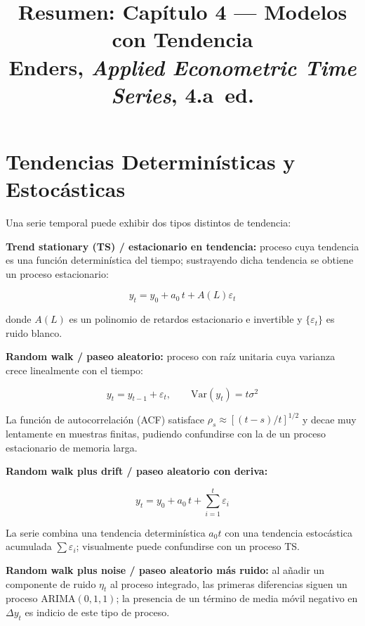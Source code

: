 \documentclass[12pt]{article}
\title{Resumen: Cap\'itulo 4 --- Modelos con Tendencia\\[4pt]
\large Enders, \textit{Applied Econometric Time Series}, 4.a~ed.}
\author{}
\date{}
\begin{document}
\maketitle
\tableofcontents
\newpage

\section{Tendencias Determin\'isticas y Estoc\'asticas}

Una serie temporal puede exhibir dos tipos distintos de tendencia:

\textbf{Trend stationary (TS) / estacionario en tendencia:} proceso cuya
tendencia es una funci\'on determin\'istica del tiempo; sustrayendo dicha
tendencia se obtiene un proceso estacionario:

\begin{equation}
  y_t = y_0 + a_0\,t + A(L)\varepsilon_t
\end{equation}

donde $A(L)$ es un polinomio de retardos estacionario e invertible y
$\{\varepsilon_t\}$ es ruido blanco.

\textbf{Random walk / paseo aleatorio:} proceso con ra\'iz unitaria cuya
varianza crece linealmente con el tiempo:

\begin{equation}
  y_t = y_{t-1} + \varepsilon_t, \qquad \mathrm{Var}(y_t) = t\sigma^2
\end{equation}

La funci\'on de autocorrelaci\'on (ACF) satisface
$\rho_s \approx [(t-s)/t]^{1/2}$ y decae muy lentamente en muestras
finitas, pudiendo confundirse con la de un proceso estacionario de
memoria larga.

\textbf{Random walk plus drift / paseo aleatorio con deriva:}

\begin{equation}
  y_t = y_0 + a_0\,t + \sum_{i=1}^{t}\varepsilon_i
\end{equation}

La serie combina una tendencia determin\'istica $a_0 t$ con una tendencia
estoc\'astica acumulada $\sum \varepsilon_i$; visualmente puede confundirse
con un proceso TS.

\textbf{Random walk plus noise / paseo aleatorio m\'as ruido:} al a\~nadir
un componente de ruido $\eta_t$ al proceso integrado, las primeras
diferencias siguen un proceso ARIMA$(0,1,1)$; la presencia de un t\'ermino
de media m\'ovil negativo en $\Delta y_t$ es indicio de este tipo de proceso.
\end{document}
